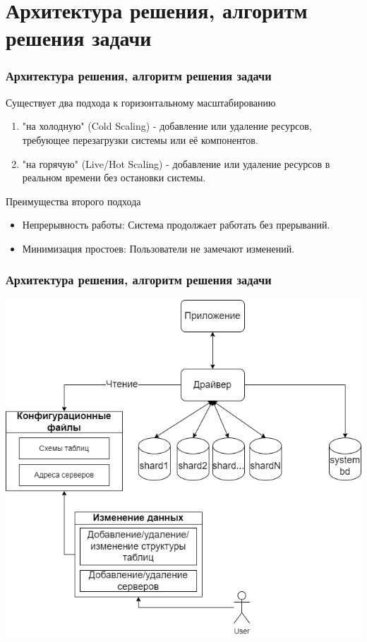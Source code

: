 \documentclass[pdf, hyperref={unicode}, aspectratio=169]{beamer}
\begin{document}
\section{Архитектура решения, алгоритм решения задачи}
\begin{frame}
	\frametitle{Архитектура решения, алгоритм решения задачи}

	Существует два подхода к горизонтальному масштабированию
	\begin{enumerate}
		\item "на холодную" (Cold Scaling) - добавление или удаление ресурсов, требующее перезагрузки системы или её компонентов.
		\item "на горячую" (Live/Hot Scaling) - добавление или удаление ресурсов в реальном времени без остановки системы.
	\end{enumerate}
	Преимущества второго подхода
	\begin{itemize}
		\item Непрерывность работы: Система продолжает работать без прерываний.
		\item Минимизация простоев: Пользователи не замечают изменений.
	\end{itemize}
	
\end{frame}


\begin{frame}
	\frametitle{Архитектура решения, алгоритм решения задачи}
	\begin{minipage}{.6\textwidth}
			\includegraphics[width=\textwidth]{img/arch2.png}
	\end{minipage}%
	\begin{minipage}{.5\textwidth}
			\label{fig:arch2}
	\end{minipage}
\end{frame}
\end{document}
